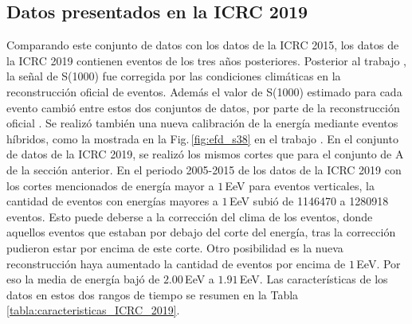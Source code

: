 
	 \subsection{Datos presentados en la ICRC 2019}\label{conjuntoB}
	 	Comparando este conjunto de datos con los datos de la ICRC 2015, los datos de la ICRC 2019 contienen eventos de los tres años posteriores. Posterior al trabajo \cite{aab2017impact}, la señal de S(1000) fue corregida por las condiciones climáticas en la reconstrucción oficial de eventos. Además el valor de S(1000) estimado para cada evento cambió entre estos dos conjuntos de datos, por parte de la reconstrucción oficial \cite{isabel}. Se realizó también una nueva calibración de la energía mediante eventos híbridos, como la mostrada en la Fig.\,\ref{fig:efd_s38} en el trabajo  \cite{tobepublished}. En el conjunto de datos de la ICRC 2019, se realizó los mismos cortes que para el conjunto de A de la sección anterior. En el periodo 2005-2015 de los datos de la ICRC 2019 con los cortes mencionados de energía mayor a $1\,$EeV para eventos verticales, la cantidad de eventos con energías mayores a $1\,$EeV subió de 1146470 a  1280918 eventos. Esto puede deberse a la corrección del clima de los eventos, donde aquellos eventos que estaban por debajo del corte del energía, tras la corrección pudieron estar por encima de este corte. Otro posibilidad es la nueva reconstrucción haya aumentado la cantidad de eventos por encima de $1\,$EeV. Por eso la media de energía bajó de $2.00\,$EeV a $1.91\,$EeV.  Las características de los datos en estos dos rangos de tiempo se resumen en la Tabla\,\ref{tabla:caracteristicas_ICRC_2019}. 
